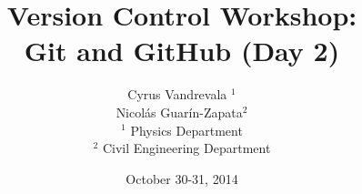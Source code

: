 



\title{Version Control Workshop: \\Git and GitHub (Day 2)}
\subtitle{}
\author[AUTHOR]{\scriptsize{Cyrus Vandrevala $^1$\\Nicol\'as Guar\'in-Zapata$^2$}\\
\tiny{$^1$ Physics Department\\ $^2$ Civil Engineering Department}}
\date{October 30-31, 2014}













